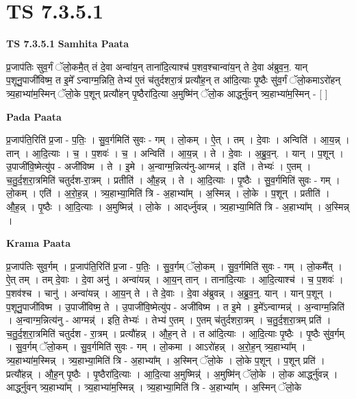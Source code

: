 \documentclass[17pt]{extarticle}
\begin{document}
\section{ TS 7.3.5.1 }

\textbf{TS 7.3.5.1 } \newline
\textbf{Samhita Paata} \newline

प्र॒जाप॑तिः सुव॒र्गं ॅलो॒कमै॒त् तं दे॒वा अन्वा॑य॒न् ताना॑दि॒त्याश्च॑ प॒शव॒श्चान्वा॑य॒न् ते दे॒वा अ॑ब्रुव॒न॒. यान् प॒शूनु॒पाजी॑विष्म॒ त इ॒मे᳚ ऽन्वाग्म॒न्निति॒ तेभ्य॑ ए॒तं च॑तुर्दशरा॒त्रं प्रत्यौ॑ह॒न् त आ॑दि॒त्याः पृ॒ष्ठैः सु॑व॒र्गं ॅलो॒कमाऽरो॑हन् त्र्य॒हाभ्या॑म॒स्मिन् ॅलो॒के प॒शून् प्रत्यौ॑हन् पृ॒ष्ठैरा॑दि॒त्या अ॒मुष्मि॑न् ॅलो॒क आर्द्ध्नु॑वन् त्र्य॒हाभ्या॑म॒स्मिन् - [  ] \newline

\textbf{Pada Paata} \newline

प्र॒जाप॑ति॒रिति॑ प्र॒जा - प॒तिः॒ । सु॒व॒र्गमिति॑ सुवः - गम् । लो॒कम् । ऐ॒त् । तम् । दे॒वाः । अन्विति॑ । आ॒य॒न्न् । तान् । आ॒दि॒त्याः । च॒ । प॒शवः॑ । च॒ । अन्विति॑ । आ॒य॒न्न् । ते । दे॒वाः । अ॒ब्रु॒व॒न्. । यान् । प॒शून् । उ॒पाजी॑वि॒ष्मेत्यु॑प - अजी॑विष्म । ते । इ॒मे । अ॒न्वाग्म॒न्नित्य॑नु-आग्मन्न्॑ । इति॑ । तेभ्यः॑ । ए॒तम् । च॒तु॒र्द॒श॒रा॒त्रमिति॑ चतुर्दश-रा॒त्रम् । प्रतीति॑ । औ॒ह॒न्न् । ते । आ॒दि॒त्याः । पृ॒ष्ठैः । सु॒व॒र्गमिति॑ सुवः - गम् । लो॒कम् । एति॑ । अ॒रो॒ह॒न्न् । त्र्य॒हाभ्या॒मिति॑ त्रि - अ॒हाभ्या᳚म् । अ॒स्मिन्न् । लो॒के । प॒शून् । प्रतीति॑ । औ॒ह॒न्न् । पृ॒ष्ठैः । आ॒दि॒त्याः । अ॒मुष्मिन्न्॑ । लो॒के । आद्‌र्ध्नु॑वन्न् । त्र्य॒हाभ्या॒मिति॑ त्रि - अ॒हाभ्या᳚म् । अ॒स्मिन्न् ।  \newline


\textbf{Krama Paata} \newline

प्र॒जाप॑तिः सुव॒र्गम् । प्र॒जाप॑ति॒रिति॑ प्र॒जा - प॒तिः॒ । सु॒व॒र्गम् ॅलो॒कम् । सु॒व॒र्गमिति॑ सुवः - गम् । लो॒कमै᳚त् । ऐ॒त् तम् । तम् दे॒वाः । दे॒वा अनु॑ । अन्वा॑यन्न् । आ॒य॒न् तान् । ताना॑दि॒त्याः । आ॒दि॒त्याश्च॑ । च॒ प॒शवः॑ । प॒शव॑श्च । चानु॑ । अन्वा॑यन्न् । आ॒य॒न् ते । ते दे॒वाः । दे॒वा अ॑ब्रुवन्न् । अ॒ब्रु॒व॒न्॒. यान् । यान् प॒शून् । प॒शूनु॒पाजी॑विष्म । उ॒पाजी॑विष्म॒ ते । उ॒पाजी॑वि॒ष्मेत्यु॑प - अजी॑विष्म । त इ॒मे । इ॒मे᳚ऽन्वाग्मन्न्॑ । अ॒न्वाग्म॒न्निति॑ । अ॒न्वाग्म॒न्नित्य॑नु - आग्मन्न्॑ । इति॒ तेभ्यः॑ । तेभ्य॑ ए॒तम् । ए॒तम् च॑तुर्दशरा॒त्रम् । च॒तु॒र्द॒श॒रा॒त्रम् प्रति॑ । च॒तु॒र्द॒श॒रा॒त्रमिति॑ चतुर्दश - रा॒त्रम् । प्रत्यौ॑हन्न् । औ॒ह॒न् ते । त आ॑दि॒त्याः । आ॒दि॒त्याः पृ॒ष्ठैः । पृ॒ष्ठैः सु॑व॒र्गम् । सु॒व॒र्गम् ॅलो॒कम् । सु॒व॒र्गमिति॑ सुवः - गम् । लो॒कमा । आऽरो॑हन्न् । अ॒रो॒ह॒न् त्र्य॒हाभ्या᳚म् । त्र्य॒हाभ्या॑म॒स्मिन्न् । त्र्य॒हाभ्या॒मिति॑ त्रि - अ॒हाभ्या᳚म् । अ॒स्मिन् ॅलो॒के । लो॒के प॒शून् । प॒शून् प्रति॑ । प्रत्यौ॑हन्न् । औ॒ह॒न् पृ॒ष्ठैः । पृ॒ष्ठैरा॑दि॒त्याः । आ॒दि॒त्या अ॒मुष्मिन्न्॑ । अ॒मुष्मि॑न् ॅलो॒के । लो॒क आर्द्ध्नु॑वन्न् । आर्द्ध्नु॑वन् त्र्य॒हाभ्या᳚म् । त्र्य॒हाभ्या॑म॒स्मिन्न् । त्र्य॒हाभ्या॒मिति॑ त्रि - अ॒हाभ्या᳚म् । अ॒स्मिन् ॅलो॒के \newline
\end{document}
